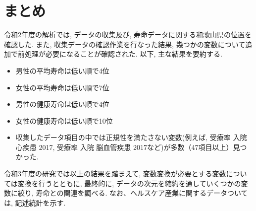 \chapter{まとめ}

令和2年度の解析では, データの収集及び, 寿命データに関する和歌山県の位置を確認した.
また, 収集データの確認作業を行なった結果, 幾つかの変数について追加で前処理が必要になることが確認された.
以下, 主な結果を要約する.
\begin{itemize}
	\item 男性の平均寿命は低い順で4位
	\item 女性の平均寿命は低い順で7位
	\item 男性の健康寿命は低い順で4位
	\item 女性の健康寿命は低い順で10位
	\item 収集したデータ項目の中では正規性を満たさない変数(例えば, 受療率 入院 心疾患 2017, 受療率 入院 脳血管疾患 2017など)が多数（47項目以上）見つかった.
\end{itemize}


令和3年度の研究では以上の結果を踏まえて,
変数変換が必要とする変数については変換を行うとともに,
最終的に, データの次元を縮約を通していくつかの変数に絞り,
寿命との関連を調べる.
なお、ヘルスケア産業に関するデータついては, 記述統計を示す.



%
%
%
%
%
%
%
%
%




